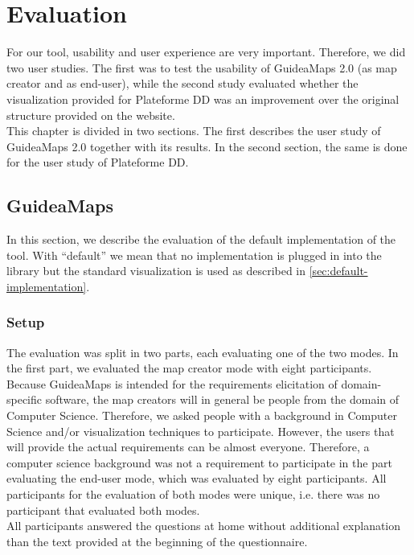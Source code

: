 \chapter{Evaluation}\label{ch:evaluation}
For our tool, usability and user experience are very important. Therefore, we did two user studies. The first was to test the usability of GuideaMaps 2.0 (as map creator and as end-user), while the second study evaluated whether the visualization provided for Plateforme DD was an improvement over the original structure provided on the website.\\

This chapter is divided in two sections. The first describes the user study of GuideaMaps 2.0 together with its results. In the second section, the same is done for the user study of Plateforme DD.





\section{GuideaMaps}
In this section, we describe the evaluation of the default implementation of the tool. With ``default'' we mean that no implementation is plugged in into the library but the standard visualization is used as described in \autoref{sec:default-implementation}.

\subsection{Setup}
The evaluation was split in two parts, each evaluating one of the two modes. In the first part, we evaluated the map creator mode with eight participants. Because GuideaMaps is intended for the requirements elicitation of domain-specific software, the map creators will in general be people from the domain of Computer Science. Therefore, we asked people with a background in Computer Science and/or visualization techniques to participate. However, the users that will provide the actual requirements can be almost everyone. Therefore, a computer science background was not a requirement to participate in the part evaluating the end-user mode, which was evaluated by eight participants. All participants for the evaluation of both modes were unique, i.e. there was no participant that evaluated both modes.\\

All participants answered the questions at home without additional explanation than the text provided at the beginning of the questionnaire.

